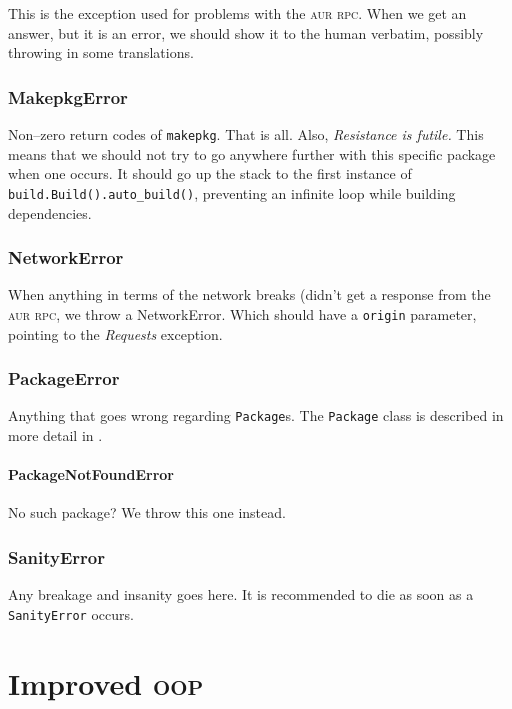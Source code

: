 \documentclass[a4paper,english]{book}
\numberwithin{equation}{section}
\newcommand{\p}[1]{\nohyphens{\texttt{#1}}}
\begin{document}
This is the exception used for problems with the \textsc{aur rpc}.  When we get an answer, but it is an error, we should show it to the human verbatim, possibly throwing in some translations.

\section{MakepkgError}

Non–zero return codes of \p{makepkg}.  That is all.  Also, \emph{Resistance is futile.}  This means that we should not try to go anywhere further with this specific package when one occurs.  It should go up the stack to the first instance of \p{build.Build().auto\_build()}, preventing an infinite loop while building dependencies.

\section{NetworkError}

When anything in terms of the network breaks (didn’t get a response from the \textsc{aur rpc}, we throw a NetworkError.  Which should have a \p{origin} parameter, pointing to the \emph{Requests} exception.

\section{PackageError}

Anything that goes wrong regarding \p{Package}s.  The \p{Package} class is described in more detail in .

\subsection{PackageNotFoundError}

No such package?  We throw this one instead.

\section{SanityError}

Any breakage and insanity goes here.  It is recommended to die as soon as a \p{SanityError} occurs.

\part{Improved \textsc{oop}}
\end{document}
